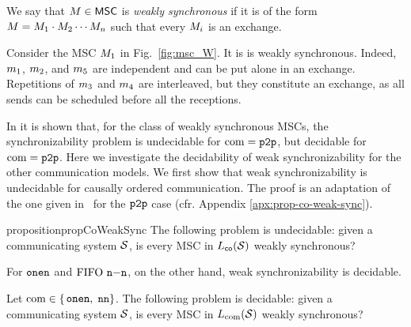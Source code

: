 \begin{definition}\label{def:weaksync-new}
	We say that $M \in \mathsf{MSC}$ is
	\emph{weakly synchronous} if it is of the form
	$M = M_1 \cdot M_2 \cdots M_n$
	such that every $M_i$ is an exchange.
\end{definition}

\begin{example}\label{example:msc_W}
	Consider the MSC $M_{1}$ in Fig.~\ref{fig:msc_W}. It is is weakly synchronous. Indeed, $m_1$, $m_2$, and $m_5$ are independent and can be put alone in an exchange. Repetitions of $m_3$ and $m_4$ are interleaved, but they constitute an exchange, as  all sends can be scheduled before all the receptions.
\end{example}

In \cite{BolligGFLLS21} it is shown that, for the class of weakly synchronous MSCs, 
the synchronizability problem is undecidable for $\textup{com} = \mathtt{p2p}$, but decidable for $\textup{com} = \mathtt{p2p}$.
Here we investigate the decidability of weak synchronizability for the other 
communication models. We first show that weak synchronizability 
is undecidable for causally ordered communication. 
The proof is an adaptation of the one given in~\cite[Theorem~20]{BolligGFLLS21-long} for the $\mathtt{p2p}$ case (cfr. Appendix \ref{apx:prop-co-weak-sync}).
\begin{restatable}{proposition}{propCoWeakSync}
\label{prop:co-weaksync}
	The following problem is undecidable:
	given a communicating system $\mathcal{S}$,
	is every MSC in $L_{\mathsf{co}}(\mathcal{S})$ weakly synchronous?
\end{restatable}

For $\mathtt{onen}$ and $\text{FIFO } \mathtt{n\mathsf{-}n}$, on the other hand, weak synchronizability is decidable. 

\begin{proposition}\label{thm:weak-sync}
	Let $\textup{com} \in \{$$\mathtt{onen}, $ $\mathtt{nn}\}$.
	The following problem is decidable:
	given a communicating system $\mathcal{S}$,
	is every MSC in $L_{\textup{com}}(\mathcal{S})$ weakly synchronous?
\end{proposition}


